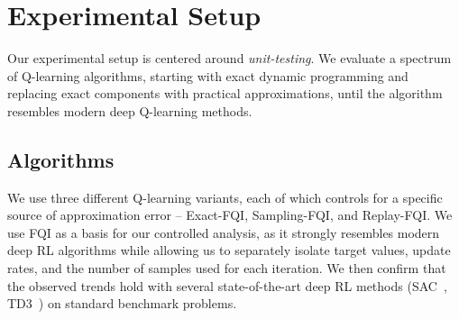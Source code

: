 \section{Experimental Setup}
\label{sec:setup}
Our experimental setup is centered around \emph{unit-testing}. We evaluate a spectrum of Q-learning algorithms, starting with exact dynamic programming and replacing exact components with practical approximations, until the algorithm resembles modern deep Q-learning methods. 


\subsection{Algorithms}
\label{sec:setup_algos}
We use three different Q-learning variants, each of which controls for a specific source of approximation error -- 
Exact-FQI, Sampling-FQI, and Replay-FQI. 
We use FQI as a basis for our controlled analysis, as it strongly resembles modern deep RL algorithms while allowing us to separately isolate target values, update rates, and the number of samples used for each iteration. We then confirm that the observed trends hold with several state-of-the-art deep RL methods (SAC~\citep{Haarnoja2017}, TD3~\citep{pmlr-v80-fujimoto18a}) on standard benchmark problems.

